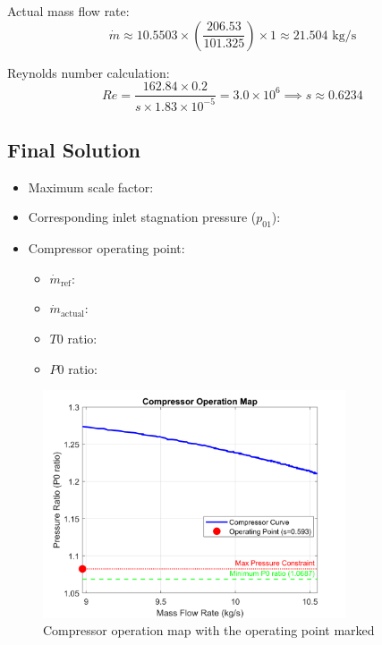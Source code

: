 \documentclass[12pt]{article}
\begin{document}
Actual mass flow rate:
\begin{equation}
    \dot{m} \approx 10.5503 \times \left(\frac{206.53}{101.325}\right) \times 1 \approx 21.504 \text{ kg/s}
\end{equation}

Reynolds number calculation:
\begin{equation}
    Re = \frac{162.84 \times 0.2}{s \times 1.83 \times 10^{-5}} = 3.0 \times 10^6 \implies s \approx 0.6234
\end{equation}

\subsection*{Final Solution}
\begin{itemize}
    \item Maximum scale factor: 
    \item Corresponding inlet stagnation pressure ($p_{01}$): 
    \item Compressor operating point:
    \begin{itemize}
        \item $\dot{m}_{\text{ref}}$: 
        \item $\dot{m}_{\text{actual}}$: 
        \item $T0$ ratio: 
        \item $P0$ ratio: 
    \end{itemize}
\end{itemize}

\begin{figure}[H]
    \centering
    \includegraphics[width=0.8\textwidth]{compressor_map.png}
    \caption{Compressor operation map with the operating point marked}
    \label{fig:comp_map}
\end{figure}
\end{document}
